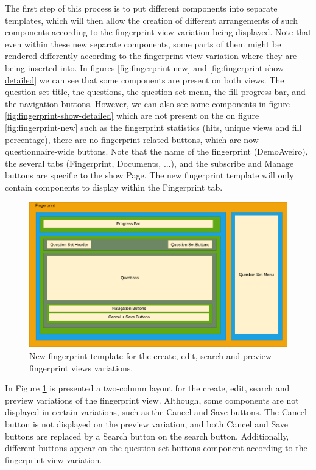 The first step of this process is to put different components into separate templates, which will then allow the creation of different arrangements of such components according to the fingerprint view variation being displayed.
Note that even within these new separate components, some parts of them might be rendered differently according to the fingerprint view variation where they are being inserted into.
In figures \ref{fig:fingerprint-new} and \ref{fig:fingerprint-show-detailed} we can see that some components are present on both views.
The question set title, the questions, the question set menu, the fill progress bar, and the navigation buttons.
However, we can also see some components in figure \ref{fig:fingerprint-show-detailed} which are not present on the on figure \ref{fig:fingerprint-new} such as the fingerprint statistics (hits, unique views and fill percentage), there are no fingerprint-related buttons, which are now questionnaire-wide buttons.
Note that the name of the fingerprint (DemoAveiro), the several tabs (Fingerprint, Documents, ...), and the subscribe and Manage buttons are specific to the show Page.
The new fingerprint template will only contain components to display within the Fingerprint tab.

\begin{figure}[H]
    \center
    \includegraphics[width=\textwidth]{fingerprint-other-after-diagram}
    \caption{New fingerprint template for the create, edit, search and preview fingerprint views variations.}
    \label{fig:fingerprint-other-after-diagram}
\end{figure}

In Figure \ref{fig:fingerprint-other-after-diagram} is presented a two-column layout for the create, edit, search and preview variations of the fingerprint view.
Although, some components are not displayed in certain variations, such as the Cancel and Save buttons.
The Cancel button is not displayed on the preview variation, and both Cancel and Save buttons are replaced by a Search button on the search button.
Additionally, different buttons appear on the question set buttons component according to the fingerprint view variation.

